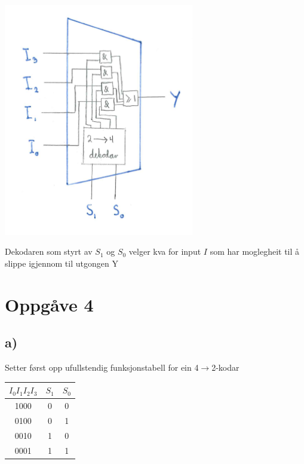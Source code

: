 \documentclass[12pt,a4paper]{article}
\begin{document}
      \begin{center}
        \includegraphics[width=83mm]{03_3}
      \end{center}
      Dekodaren som styrt av $S_1$ og $S_0$ velger kva for input $I$ som har moglegheit
      til å slippe igjennom til utgongen Y

    \section{Oppgåve 4}
      \subsection{a)}
        Setter først opp ufullstendig funksjonstabell for ein 4$\rightarrow$2-kodar
          \begin{center}
            \begin{tabular}{ |c|c|c| }
              \hline
              $I_0I_1I_2I_3$ & $S_1$ & $S_0$ \\
              \hline
              1000 & 0 & 0 \\
              \hline
              0100 & 0 & 1 \\
              \hline
              0010 & 1 & 0 \\
              \hline
              0001 & 1 & 1 \\
              \hline
            \end{tabular}
          \end{center}
        
\end{document}

